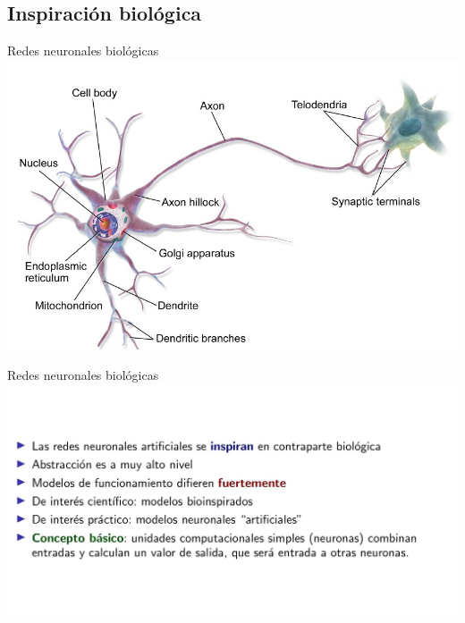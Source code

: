 \documentclass[8pt]{beamer}  %
\begin{document}
\subsection{Inspiración biológica}
\begin{frame}{Redes neuronales biológicas}
	\includegraphics[width=\textwidth]{neurona}
\end{frame}
\begin{frame}{Redes neuronales biológicas}
	\includegraphics[width=\textwidth]{im3}
\end{frame}
\end{document}
